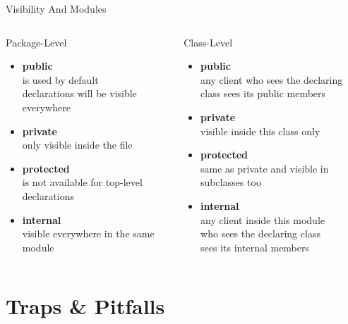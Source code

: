 \begin{frame}[fragile]{Visibility And Modules}
	\begin{columns}
		\begin{column}{0.45\textwidth}
			Package-Level
			\begin{itemize}
				\item \textbf{public}\\
				is used by default\\
				declarations will be visible everywhere
				\item \textbf{private}\\
				only visible inside the file
				\item \textbf{protected}\\
				is not available for top-level declarations
				\item \textbf{internal}\\
				visible everywhere in the same module
			\end{itemize}
		\end{column}
		\begin{column}{0.55\textwidth}
			Class-Level
			\begin{itemize}
				\item \textbf{public}\\
				any client who sees the declaring\\
				class sees its public members
				\item \textbf{private}\\
				visible inside this class only
				\item \textbf{protected}\\
				same as private and visible in subclasses too
				\item \textbf{internal}\\
				any client inside this module\\
				who sees the declaring class\\
				sees its internal members
			\end{itemize}
		\end{column}
	\end{columns}
\end{frame}

\section{Traps \& Pitfalls}

